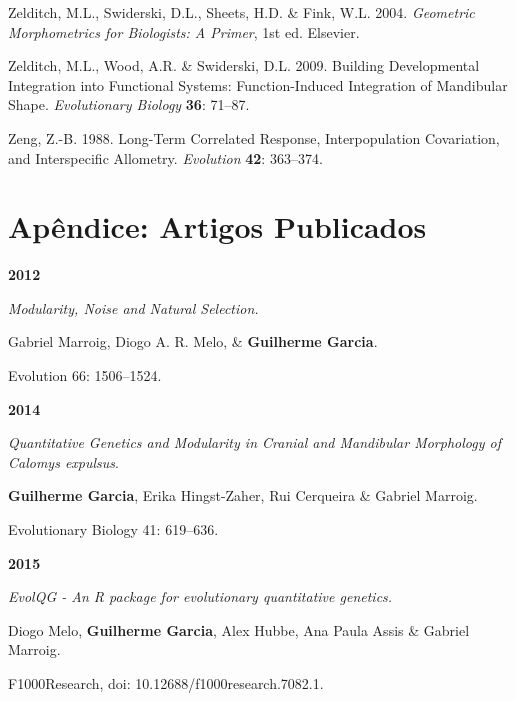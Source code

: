 \documentclass[12pt,twoside]{report}
\begin{document}
Zelditch, M.L., Swiderski, D.L., Sheets, H.D. \& Fink, W.L. 2004.
\emph{Geometric Morphometrics for Biologists: A Primer}, 1st ed.
Elsevier.

Zelditch, M.L., Wood, A.R. \& Swiderski, D.L. 2009. Building
Developmental Integration into Functional Systems: Function-Induced
Integration of Mandibular Shape. \emph{Evolutionary Biology}
\textbf{36}: 71--87.

Zeng, Z.-B. 1988. Long-Term Correlated Response, Interpopulation
Covariation, and Interspecific Allometry. \emph{Evolution} \textbf{42}:
363--374.

\chapter*{Apêndice: Artigos Publicados}

\textbf {2012}

\textit {Modularity, Noise and Natural Selection.}

Gabriel Marroig, Diogo A. R. Melo, \& \textbf {Guilherme Garcia}.  

Evolution 66: 1506–1524.

\vspace {0.3 cm}

\textbf{2014}

\textit{Quantitative Genetics and Modularity in Cranial and Mandibular Morphology of \emph{Calomys expulsus}}.

\textbf {Guilherme Garcia}, Erika Hingst-Zaher, Rui Cerqueira \& Gabriel Marroig.

Evolutionary Biology 41: 619–636.

\vspace {0.3 cm}

\textbf{2015}

\textit {EvolQG - An R package for evolutionary quantitative genetics.}

Diogo Melo, \textbf{Guilherme Garcia}, Alex Hubbe, Ana Paula Assis \& Gabriel Marroig.  

F1000Research, doi: 10.12688/f1000research.7082.1.






\end{document}
